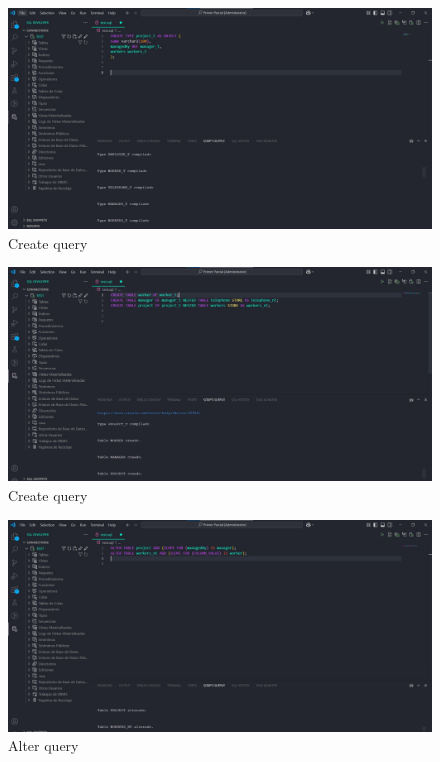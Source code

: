 \documentclass{article}
\begin{document}
\begin{figure}[H]
	\centering
	\includegraphics[width=1\textwidth]{imgs/c1.jpeg}
	\caption{Create query}
	\label{fig:6}
\end{figure}

\begin{figure}[H]
	\centering
	\includegraphics[width=1\textwidth]{imgs/c2.jpeg}
	\caption{Create query}
	\label{fig:7}
\end{figure}

\begin{figure}[H]
	\centering
	\includegraphics[width=1\textwidth]{imgs/al.jpeg}
	\caption{Alter query}
	\label{fig:8}
\end{figure}
\end{document}
